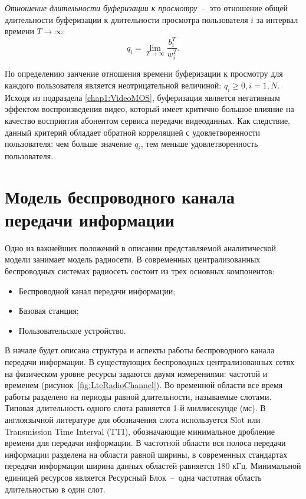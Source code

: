 \begin{definition}
\label{def:BWTR}
    \emph{Отношение длительности буферизации к просмотру}~--~это отношение общей длительности буферизации к длительности просмотра пользователя $i$ за интервал времени $T\rightarrow\infty$:
    $$q_i = \lim\limits_{T\rightarrow\infty} \frac{b_i^T}{w_i^T}.$$
\end{definition}

По определению занчение отношения времени буферизации к просмотру для каждого пользователя является неотрицательной величиной: $q_i \geq 0, i=\overline{1,N}.$ Исходя из подраздела \ref{chap1:VideoMOS}, буферизация является негативным эффектом воспроизведения видео, который имеет критично большое влияние на качество восприятия абонентом сервиса передачи видеоданных. Как следствие, данный критерий обладает обратной корреляцией с удовлетворенности пользователя: чем больше значение $q_i$, тем меньше удовлетворенность пользователя.

\section{Модель беспроводного канала передачи информации}
\label{chap2:RadioChannel}

Одно из важнейших положений в описании представляемой аналитической модели занимает модель радиосети. В современных централизованных беспроводных системах радиосеть состоит из трех основных компонентов:
\begin{itemize}
	\item Беспроводной канал передачи информации;
	\item Базовая станция;
	\item Пользовательское устройство.
\end{itemize}

В начале будет описана структура и аспекты работы беспроводного канала передачи информации. В существующих беспроводных централизованных сетях на физическом уровне ресурсы задаются двумя измерениями: частотой и временем (рисунок~\ref{fig:LteRadioChannel}). Во временной области все время работы разделено на периоды равной длительности, называемые слотами. Типовая длительность одного слота равняется 1-й миллисекунде (мс). В англоязычной литературе для обозначения слота используется Slot или Transmission Time Interval (TTI), обозначающие минимальное дробление времени для передачи информации. В частотной области вся полоса передачи информации разделена на области равной ширины, в современных стандартах передачи информации ширина данных областей равняется 180 кГц. Минимальной единицей ресурсов является Ресурсный Блок~--~одна частотная область длительностью в один слот.

